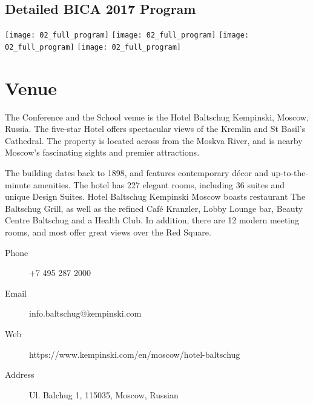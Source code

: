\documentclass[10pt,fleqn,openany]{book} %
\begin{document}
\section{Detailed BICA 2017 Program}	

	\texttt{[image: 02\_full\_program]}
	\vfill
	\texttt{[image: 02\_full\_program]}
	\vfill
	\texttt{[image: 02\_full\_program]}
	\vfill
	\texttt{[image: 02\_full\_program]}
	\vfill


\chapter{Venue}

The Conference and the School venue is the Hotel Baltschug Kempinski, Moscow, Russia. The five-star Hotel offers spectacular views of the Kremlin and St Basil’s Cathedral. The property is located across from the Moskva River, and is nearby Moscow’s fascinating sights and premier attractions.




The building dates back to 1898, and features contemporary décor and up-to-the-minute amenities. The hotel has 227 elegant rooms, including 36 suites and unique Design Suites. Hotel Baltschug Kempinski Moscow boasts restaurant The Baltschug Grill, as well as the refined Café Kranzler, Lobby Lounge bar, Beauty Centre Baltschug and a Health Club. In addition, there are 12 modern meeting rooms, and most offer great views over the Red Square. 

\par\bigskip
\par\bigskip
\par\bigskip
\par\bigskip
\par\bigskip
{}

\begin{description}
	\item[Phone] +7 495 287 2000
	\item[Email] info.baltschug@kempinski.com
	\item[Web] https://www.kempinski.com/en/moscow/hotel-baltschug
	\item[Address] Ul. Balchug 1, 115035, Moscow, Russian
\end{description}
\end{document}
